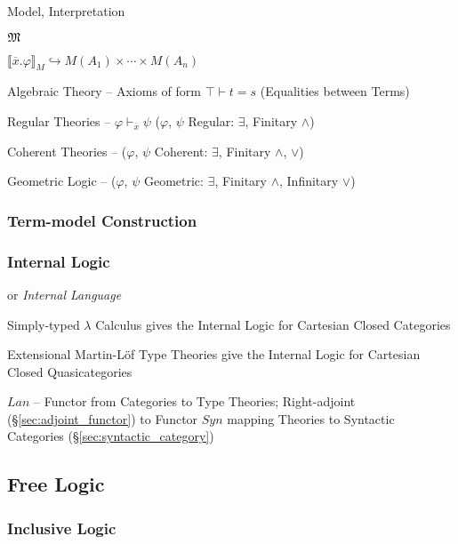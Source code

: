 Model, Interpretation

$\mathfrak{M}$

$\llbracket \overline{x}.\varphi \rrbracket_M \hookrightarrow M(A_1)
\times \cdots \times M(A_n)$


Algebraic Theory -- Axioms of form $\top \vdash t = s$ (Equalities
between Terms)

Regular Theories -- $\varphi \vdash_{\overline{x}} \psi$ ($\varphi$,
$\psi$ Regular: $\exists$, Finitary $\wedge$)

Coherent Theories -- ($\varphi$, $\psi$ Coherent: $\exists$, Finitary
$\wedge$, $\vee$)

Geometric Logic -- ($\varphi$, $\psi$ Geometric: $\exists$, Finitary
$\wedge$, Infinitary $\vee$)




\subsubsection{Term-model Construction}\label{sec:term_model}

\subsubsection{Internal Logic}\label{sec:internal_logic}

or \emph{Internal Language}

Simply-typed $\lambda$ Calculus gives the Internal Logic for
Cartesian Closed Categories

Extensional Martin-L\"of Type Theories give the Internal Logic for
Cartesian Closed Quasicategories

$Lan$ -- Functor from Categories to Type Theories; Right-adjoint
(\S\ref{sec:adjoint_functor}) to Functor $Syn$ mapping Theories to
Syntactic Categories (\S\ref{sec:syntactic_category})



\subsection{Free Logic}\label{sec:free_logic}

\subsubsection{Inclusive Logic}\label{sec:inclusive_logic}



